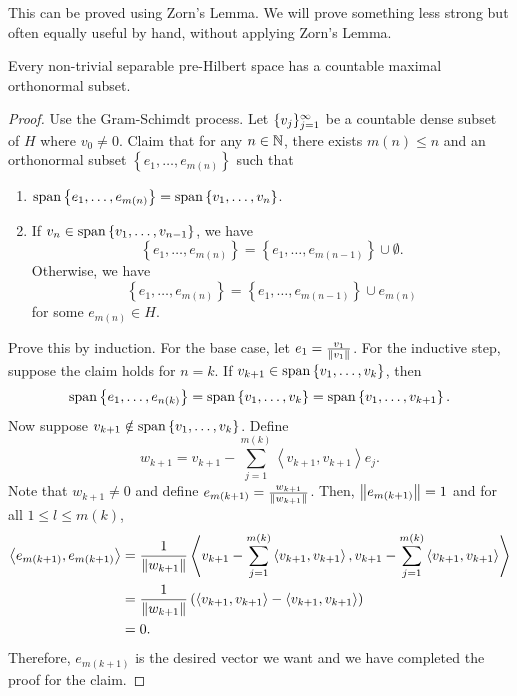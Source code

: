 \documentclass[a4paper]{article}
\renewcommand{\braket}[2]{\left\langle #1, #1 \right\rangle}
\begin{document}
This can be proved using Zorn's Lemma. We will prove
something less strong but often equally useful by hand,
without applying Zorn's Lemma.

\begin{thm}
  Every non-trivial separable pre-Hilbert space
  has a countable maximal orthonormal subset.
\end{thm}

\begin{proof}
  Use the Gram-Schimdt process.
  Let $\{ v_j \}_{j=1}^\infty$ be a countable dense subset of $H$
  where $v_0 \neq 0$. Claim that for any $n \in \mathbb{N}$,
  there exists $m(n) \leq n$ and an orthonormal subset
  $\left\{ e_1, \dots, e_{m(n)} \right\}$ such that
  \begin{enumerate}
    \item $\operatorname{span} \left\{ e_1, \dots, e_{m(n)} \right\}
            = \operatorname{span} \left\{ v_1, \dots, v_n \right\}$.

    \item
          If $v_n \in \operatorname{span} \left\{ v_1, \dots, v_{n-1}
            \right\}$, we have
          \[
            \left\{ e_1, \dots, e_{m(n)} \right\}
            = \left\{ e_1, \dots, e_{m(n-1)} \right\} \cup
            \emptyset.
          \]
          Otherwise, we have
          \[
            \left\{ e_1, \dots, e_{m(n)} \right\}
            = \left\{ e_1, \dots, e_{m(n-1)} \right\} \cup
            e_{m(n)}
          \]
          for some $e_{m(n)} \in H$.
  \end{enumerate}
  Prove this by induction. For the base case,
  let $e_1 = \frac{v_1}{\left\lVert v_1\right\rVert}$.
  For the inductive step, suppose the claim holds for
  $n = k$. If $v_{k+1} \in \operatorname{span} \left\{ v_1, \dots, v_k \right\}$,
  then
  \[
    \operatorname{span} \left\{ e_1, \dots, e_{n(k)} \right\}
    = \operatorname{span} \left\{ v_1, \dots, v_k \right\}
    = \operatorname{span} \left\{ v_1, \dots, v_{k+1} \right\}.
  \]
  Now suppose $v_{k+1} \notin \operatorname{span} \left\{ v_1, \dots, v_k \right\}$.
  Define
  \[
    w_{k+1} = v_{k+1} - \sum_{j=1}^{m(k)} \braket{v_{k+1}}{e_j} e_j.
  \]
  Note that $w_{k+1} \neq 0$ and define $e_{m(k+1)} =
    \frac{w_{k+1}}{\left\lVert w_{k+1}\right\rVert}$. Then, $\left\lVert e_{m(k+1)}\right\rVert = 1$
  and for all $1 \leq l \leq m(k)$,
  \[
    \begin{aligned}
      \braket{e_{m(k+1)}}{e_l}
       & = \frac{1}{\norm{w_{k+1}}}
      \braket{v_{k+1} - \sum_{j=1}^{m(k)} \braket{v_{k+1}}{e_j}}{e_l} \\
       & = \frac{1}{\norm{w_{k+1}}}
      \left( \braket{v_{k+1}}{e_l} - \braket{v_{k+1}}{e_l} \right)    \\
       & = 0.
    \end{aligned}
  \]
  Therefore, $e_{m(k+1)}$ is the desired vector we want and
  we have completed the proof for the claim.


\end{proof}
\end{document}
